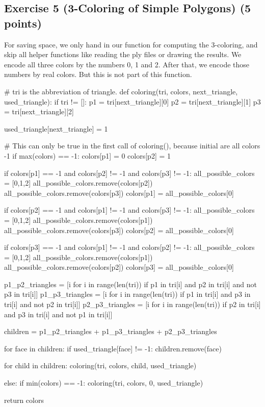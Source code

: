 \documentclass[english, fontsize=12pt, paper=a4, twoside=false, draft=true, pagesize=auto, version=last, DIV=16]{scrartcl}
\theoremstyle{break}
\begin{document}
\begin{landscape}
\section*{Exercise 5 (3-Coloring of Simple Polygons) {\large \hfill (5 points)}} 
For saving space, we only hand in our function for computing the 3-coloring, and skip all helper functions like reading the ply files or drawing the results. We encode all three colors by the numbers 0, 1 and 2. After that, we encode those numbers by real colors. But this is not part of this function. \par
\bigskip

\begin{python}
# tri is the abbreviation of triangle.
def coloring(tri, colors, next_triangle, used_triangle):
    if tri != []:
        p1 = tri[next_triangle][0]
        p2 = tri[next_triangle][1]
        p3 = tri[next_triangle][2]

        used_triangle[next_triangle] = 1

        # This can only be true in the first call of coloring(), because initial are all colors -1
        if max(colors) == -1:
            colors[p1] = 0
            colors[p2] = 1

        if colors[p1] == -1 and colors[p2] != -1 and colors[p3] != -1:
            all_possible_colors = [0,1,2]
            all_possible_colors.remove(colors[p2])
            all_possible_colors.remove(colors[p3])
            colors[p1] = all_possible_colors[0]

        if colors[p2] == -1 and colors[p1] != -1 and colors[p3] != -1:
            all_possible_colors = [0,1,2]
            all_possible_colors.remove(colors[p1])
            all_possible_colors.remove(colors[p3])
            colors[p2] = all_possible_colors[0]

        if colors[p3] == -1 and colors[p1] != -1 and colors[p2] != -1:
            all_possible_colors = [0,1,2]
            all_possible_colors.remove(colors[p1])
            all_possible_colors.remove(colors[p2])
            colors[p3] = all_possible_colors[0]
            
        p1_p2_triangles = [i for i in range(len(tri)) if p1 in tri[i] and p2 in tri[i] and not p3 in tri[i]]
        p1_p3_triangles = [i for i in range(len(tri)) if p1 in tri[i] and p3 in tri[i] and not p2 in tri[i]]
        p2_p3_triangles = [i for i in range(len(tri)) if p2 in tri[i] and p3 in tri[i] and not p1 in tri[i]]

        children = p1_p2_triangles + p1_p3_triangles + p2_p3_triangles

        for face in children:
            if used_triangle[face] != -1:
                children.remove(face)

        for child in children:
            coloring(tri, colors, child, used_triangle)

    else:
        if min(colors) == -1:
            coloring(tri, colors, 0, used_triangle)

    return colors
\end{python}
\end{landscape}
\newpage
\end{document}

